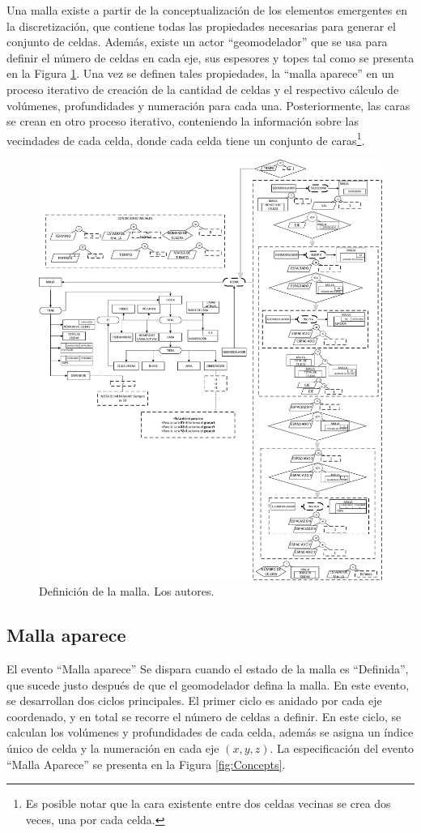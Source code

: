 Una malla existe a partir de la conceptualización de los elementos emergentes en la discretización, que contiene todas las propiedades necesarias para generar el conjunto de celdas. Además, existe un actor ``geomodelador'' que se usa para definir el número de celdas en cada eje, sus espesores y topes tal como se presenta en  la Figura \ref{fig:Mesh}. Una vez se definen tales propiedades, la ``malla aparece'' en un proceso iterativo de creación de la cantidad de celdas y el respectivo cálculo de volúmenes, profundidades y numeración para cada una. Posteriormente, las caras se crean en otro proceso iterativo, conteniendo la información sobre las vecindades de cada celda, donde cada celda tiene un conjunto de caras\footnote{Es posible notar que la cara existente entre dos celdas vecinas se crea dos veces, una por cada celda.}.\\

\begin{figure}[h]
	\centering%
	\includegraphics[width=0.8\linewidth]{Fig/Mesh.pdf}%
	\caption[Definición de la malla.]{Definición de la malla. Los autores.} \label{fig:Mesh}
\end{figure}


\subsection{Malla aparece}\label{subsec:PS_MeshAppears}
El evento ``Malla aparece'' Se dispara cuando el estado de la malla es ``Definida'', que sucede justo después de que el geomodelador defina la malla. En este evento, se desarrollan dos ciclos principales. El primer ciclo es anidado por cada eje coordenado, y en total se recorre el número de celdas a definir. En este ciclo, se calculan los volúmenes y profundidades de cada celda, además se asigna un índice único de celda y la numeración en cada eje $(x,y,z)$. La especificación del evento ``Malla Aparece'' se presenta en la Figura \ref{fig:Concepts}.\\

